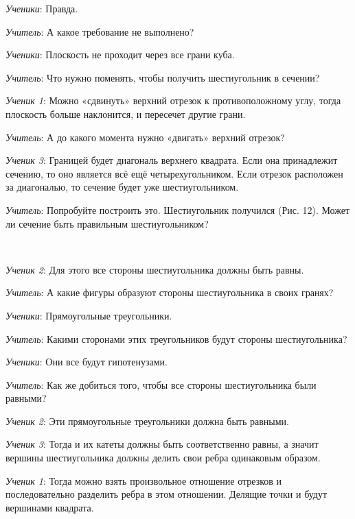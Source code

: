 \documentclass[a4paper,14pt,russian]{extreport}
\newcommand{\capt}[1]{%
    \\[8pt]
    \text{Рис. #1}
}
\begin{document}
\textit{Ученики}: Правда.

\textit{Учитель}: А какое требование не выполнено?

\textit{Ученики}: Плоскость не проходит через все грани куба.

\textit{Учитель}: Что нужно поменять, чтобы получить шестиугольник в сечении?

\textit{Ученик 1}: Можно «сдвинуть» верхний отрезок к противоположному углу, тогда плоскость больше наклонится, и пересечет другие грани.

\textit{Учитель}: А до какого момента нужно «двигать» верхний отрезок?

\textit{Ученик 3}: Границей будет диагональ верхнего квадрата. Если она принадлежит сечению, то оно является всё ещё четырехугольником. Если отрезок расположен за диагональю, то сечение будет уже шестиугольником.

\textit{Учитель}: Попробуйте построить это. Шестиугольник получился (Рис. 12). Может ли сечение быть правильным шестиугольником?

\begin{center}
    \begin{minipage}{0.3\textwidth}
        \centering
    \end{minipage}
    \capt{12}
\end{center}

\textit{Ученик 2}: Для этого все стороны шестиугольника должны быть равны.

\textit{Учитель}: А какие фигуры образуют стороны шестиугольника в своих гранях?

\textit{Ученики}: Прямоугольные треугольники.

\textit{Учитель}: Какими сторонами этих треугольников будут стороны шестиугольника?

\textit{Ученики}: Они все будут гипотенузами.

\textit{Учитель}: Как же добиться того, чтобы все стороны шестиугольника были равными? 

\textit{Ученик 2}: Эти прямоугольные треугольники должна быть равными.

\textit{Ученик 3}: Тогда и их катеты должны быть соответственно равны, а значит вершины шестиугольника должны делить свои ребра одинаковым образом.

\textit{Ученик 1}: Тогда можно взять произвольное отношение отрезков и последовательно разделить ребра в этом отношении. Делящие точки и будут вершинами квадрата. 
\end{document}
